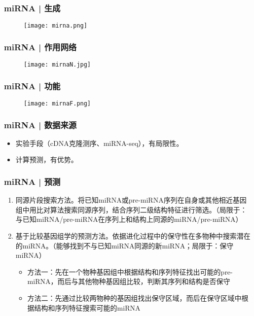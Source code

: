 \begin{frame}
  \frametitle{miRNA | 生成}
  \begin{figure}
    \centering
    \texttt{[image: mirna.png]}
  \end{figure}
\end{frame}

\begin{frame}
  \frametitle{miRNA | 作用网络}
  \begin{figure}
    \centering
    \texttt{[image: mirnaN.jpg]}
  \end{figure}
\end{frame}

\begin{frame}
  \frametitle{miRNA | 功能}
  \begin{figure}
    \centering
    \texttt{[image: mirnaF.png]}
  \end{figure}
\end{frame}

\begin{frame}
  \frametitle{miRNA | 数据来源}
  \begin{itemize}
    \item 实验手段（cDNA克隆测序、miRNA-seq），有局限性。
    \item 计算预测，有优势。
  \end{itemize}
\end{frame}

\begin{frame}
  \frametitle{miRNA | \alert{预测}}
  \begin{enumerate}
    \item 同源片段搜索方法。将已知miRNA或pre-miRNA序列在自身或其他相近基因组中用比对算法搜索同源序列，结合序列二级结构特征进行筛选。（局限于：与已知miRNA/pre-miRNA在序列上和结构上同源的miRNA/pre-miRNA）
    \item 基于比较基因组学的预测方法。依据进化过程中的保守性在多物种中搜索潜在的miRNA。（能够找到不与已知miRNA同源的新miRNA；局限于：保守miRNA）
      \begin{itemize}
	\item 方法一：先在一个物种基因组中根据结构和序列特征找出可能的pre-miRNA，而后与其他物种基因组比较，判断其序列和结构是否保守
	\item 方法二：先通过比较两物种的基因组找出保守区域，而后在保守区域中根据结构和序列特征搜索可能的miRNA
      \end{itemize}
  \end{enumerate}
\end{frame}

